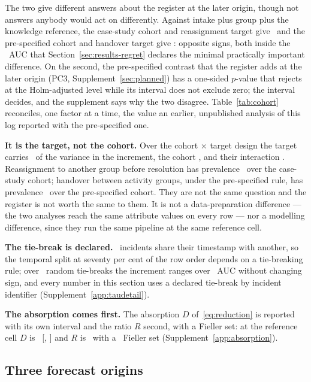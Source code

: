 \documentclass[11pt,3p,review,authoryear]{elsarticle}
\theoremstyle{definition}
\begin{document}
The two give different answers about the register at the later origin,
though not answers anybody would act on differently. Against intake plus group
plus the knowledge reference, the case-study cohort and reassignment target
give \VTtwoKnow\ and the pre-specified cohort and handover target give
\VregisteredTauTwo: opposite signs, both inside the \mpidAuc\ AUC that
Section~\ref{sec:results-regret} declares the minimal practically important
difference. On the second, the pre-specified contrast that the register
adds at the later origin (\textsf{PC3}, Supplement~\ref{sec:planned}) has a one-sided
$p$-value that rejects at the Holm-adjusted level while its interval does not
exclude zero; the interval decides, and the supplement says why the two
disagree. Table~\ref{tab:cohort} reconciles, one factor at a time, the
value an earlier, unpublished analysis of this log reported with the
pre-specified one.

\textbf{It is the target, not the cohort.} Over the cohort $\times$ target
design the target carries \shareTargetPct\ of the variance in the increment,
the cohort \shareCohortPct, and their interaction \shareCohortTargetPct.
Reassignment to another group before resolution has prevalence
\casePrevalence\ over the case-study cohort; handover between activity
groups, under the pre-specified rule, has prevalence \prevRegisteredHandover\
over the pre-specified cohort. They are not the same question and the
register is not worth the same to them. It is not a data-preparation
difference --- the two analyses reach the same attribute values on every
row --- nor a modelling difference, since they run the same pipeline at the
same reference cell.

\textbf{The tie-break is declared.} \nTiedTimestamps\ incidents share their
timestamp with another, so the temporal split at seventy per cent of the row
order depends on a tie-breaking rule; over \nTiebreakDraws\ random
tie-breaks the increment ranges over \tiebreakRange\ AUC without changing
sign, and every number in this section uses a declared tie-break by incident
identifier (Supplement~\ref{app:taudetail}).

\label{sec:absorption}
\textbf{The absorption comes first.} The absorption $D$
of~\eqref{eq:reduction} is reported with its own interval and the ratio $R$
second, with a Fieller set: at the reference cell $D$ is \Dabs\ [\DabsLo,
\DabsHi] and $R$ is \Rref\ with a \RrefKind\ Fieller set
(Supplement~\ref{app:absorption}).

\subsection{Three forecast origins}
\label{sec:twodecision}
\end{document}
